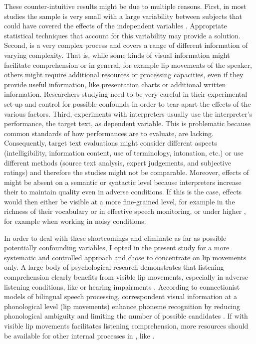 \documentclass[output=paper]{LSP/langsci}
\begin{document}
These counter-intuitive results might be due to multiple reasons. First, in most studies the sample is very small with a large variability between subjects that could have covered the effects of the independent variables \citep[108]{Anderson1994}. Appropriate statistical techniques that account for this variability may provide a solution. Second,  is a very complex process and  covers a range of different information of varying complexity. That is, while some kinds of visual information might facilitate  comprehension or  in general, for example lip movements of the speaker, others might require additional resources or processing capacities, even if they provide useful information, like presentation charts or additional written information. Researchers studying  need to be very careful in their experimental set-up and control for possible confounds in order to tear apart the effects of the various factors. Third, experiments with interpreters usually use the interpreter's performance, the target text, as dependent variable. This is problematic because common standards of how performances are to evaluate, are lacking. Consequently, target text evaluations might consider different aspects (intelligibility, information content, use of terminology, intonation, etc.) or use different methods (source text analysis, expert judgements, and subjective ratings) and therefore the studies might not be comparable. Moreover, effects of  might be absent on a semantic or syntactic level because interpreters increase their  to maintain  quality even in adverse conditions. If this is the case, effects would  then either be visible at a more fine-grained level, for example in the richness of their vocabulary or in effective speech monitoring, or under higher , for example when working in noisy conditions.

In order to deal with these shortcomings and eliminate as far as possible potentially confounding variables, I opted in the present study for a more systematic and controlled approach and chose to concentrate on lip movements only. A large body of psychological research demonstrates that listening comprehension clearly benefits from visible lip movements, especially in adverse listening conditions, like  or hearing impairments \citep{Calvert2004, Giraud2002, Kriegstein2008, Lewandowski1993, McGettigan2012, Mattys2011, Rosenblum2008, McGurk1976}. According to connectionist models of bilingual speech processing, correspondent visual information at a phonological level (lip movements) enhance phoneme recognition by reducing phonological ambiguity and limiting the number of possible candidates \citep{Shook2013}. If  with visible lip movements facilitates listening comprehension, more resources should be available for other internal processes in , like . 
\end{document}

